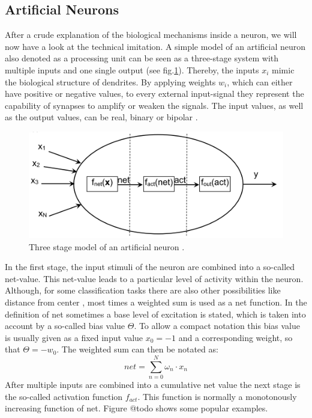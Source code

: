 \documentclass[12pt,a4paper]{article}
\begin{document}
\subsection{Artificial Neurons}
After a crude explanation of the biological mechanisms inside a neuron, we will now have a look at the technical imitation. A simple model of an artificial neuron also denoted as a processing unit can be seen as a three-stage system with multiple inputs and one single output (see fig.\ref{fig:artifical_neuron}).
\newline
Thereby, the inputs $x_i$ mimic the biological structure of dendrites. By applying weights $w_i$, which can either have positive or negative values, to every external input-signal they represent the capability of synapses to amplify or weaken the signals. The input values, as well as the output values,  can be real, binary or bipolar \cite{Patterson1997}.
\begin{figure}
    \centering
    \includegraphics[width=0.5\linewidth]{Figures/artificial_neuron.png}
    \caption{Three stage model of an artificial neuron \cite{Bartz2018}.}
    \label{fig:artifical_neuron}
\end{figure}
\newline
In the first stage, the input stimuli of the neuron are combined into a so-called net-value. This net-value leads to a particular level of activity within the neuron. Although, for some classification tasks there are also other possibilities like distance from center \cite{Schwenker2001}, most times a weighted sum is used as a net function. In the definition of net sometimes a base level of excitation is stated, which is taken into account by a so-called bias value $\Theta$. To allow a compact notation this bias value is usually given as a fixed input value $x_0 = -1$ and a corresponding weight, so that $\Theta = -w_0$. The weighted sum can then be notated as:
\begin{equation}
    \label{eq:net}
    net = \sum_{n=0}^N\omega_n \cdot x_n
\end{equation}
After multiple inputs are combined into a cumulative net value the next stage is the so-called activation function $f_{act}$. This function is normally a monotonously increasing function of net. Figure @todo shows some popular examples.
\end{document}
